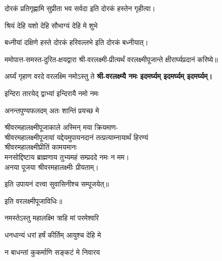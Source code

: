\begin{center}
{दोरकं प्रतिगृह्णामि सुप्रीता भव सर्वदा} 
इति दोरकं हस्तेन गृहीत्वा।


{श्रियं देहि यशो देहि सौभाग्यं देहि मे शुभे}

{बध्नीयां दक्षिणे हस्ते दोरकं हरिवल्लभे}
इति दोरकं बध्नीयात्।


ममोपात्त-समस्त-दुरित-क्षयद्वारा श्री-वरलक्ष्मी-प्रीत्यर्थं वरलक्ष्मीपूजान्ते क्षीरार्घ्यप्रदानं करिष्ये॥

{अर्घ्यं गृहाण वरदे वरलक्ष्मि नमोऽस्तु ते} 
\textbf{श्री-वरलक्ष्म्यै नमः इदमर्घ्यम् इदमर्घ्यम् इदमर्घ्यम्।}


{इन्दिरा तारयेद् द्वाभ्यां इन्दिरायै नमो नमः}

{अनन्तपुण्यफलदम् अतः शान्तिं प्रयच्छ मे}

श्रीवरमहालक्ष्मीपूजाकाले अस्मिन् मया क्रियमाण-\\
श्रीवरमहालक्ष्मीपूजायां यद्देयमुपायनदानं तत्प्रत्याम्नायार्थं हिरण्यं\\
श्रीवरमहालक्ष्मीप्रीतिं कामयमानः\\
मनसोद्दिष्टाय ब्राह्मणाय तुभ्यमहं सम्प्रददे नमः न मम।\\ 
अनया पूजया श्रीवरमहालक्ष्मीः प्रीयताम्। 

इति उपायनं दत्त्वा सुवासिनीश्च सम्पूजयेत्॥

इति वरलक्ष्मीपूजाविधिः॥

\end{center}





{नमस्तेऽस्तु महालक्ष्मि त्राहि मां परमेश्वरि}

{धनधान्यं धरां हर्षं कीर्तिम् आयुश्च देहि मे}

{न बाधन्तां कुकर्माणि सङ्कटं मे निवारय}

    
    

